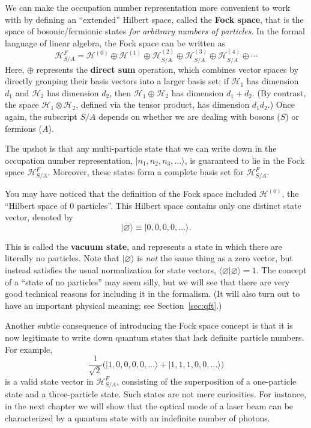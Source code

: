 \documentclass[pra,12pt]{revtex4}
\begin{document}
We can make the occupation number representation more convenient to
work with by defining an ``extended'' Hilbert space, called the
\textbf{Fock space}, that is the space of bosonic/fermionic states
\textit{for arbitrary numbers of particles}.  In the formal language
of linear algebra, the Fock space can be written as
\begin{equation}
  \mathscr{H}_{S/A}^F = \mathscr{H}^{(0)} \oplus \mathscr{H}^{(1)} \oplus \mathscr{H}^{(2)}_{S/A} \oplus \mathscr{H}^{(3)}_{S/A} \oplus \mathscr{H}^{(4)}_{S/A} \oplus \cdots
\end{equation}
Here, $\oplus$ represents the \textbf{direct sum} operation, which
combines vector spaces by directly grouping their basis vectors into a
larger basis set; if $\mathscr{H}_1$ has dimension $d_1$ and
$\mathscr{H}_2$ has dimension $d_2$, then
$\mathscr{H}_1\oplus\mathscr{H}_2$ has dimension $d_1+d_2$.  (By
contrast, the space $\mathscr{H}_1\otimes\mathscr{H}_2$, defined via
the tensor product, has dimension $d_1d_2$.)  Once again, the
subscript $S/A$ depends on whether we are dealing with bosons ($S$) or
fermions ($A$).

The upshot is that any multi-particle state that we can write down in
the occupation number representation, $|n_1,n_2,n_3,\dots\rangle$, is
guaranteed to lie in the Fock space $\mathscr{H}^{F}_{S/A}$.
Moreover, these states form a complete basis set for
$\mathscr{H}^{F}_{S/A}$.

You may have noticed that the definition of the Fock space included
$\mathscr{H}^{(0)}$, the ``Hilbert space of 0 particles''.  This
Hilbert space contains only one distinct state vector, denoted by
\begin{equation}
  |\varnothing\rangle \equiv |0,0,0,0,\dots\rangle.
\end{equation}

This is called the \textbf{vacuum state}, and represents a state in
which there are literally no particles.  Note that
$|\varnothing\rangle$ is \textit{not} the same thing as a zero vector,
but instead satisfies the usual normalization for state vectors,
$\langle\varnothing|\varnothing\rangle = 1$.  The concept of a ``state
of no particles'' may seem silly, but we will see that there are very
good technical reasons for including it in the formalism.  (It will
also turn out to have an important physical meaning; see
Section~\ref{sec:qft}.)

Another subtle consequence of introducing the Fock space concept is
that it is now legitimate to write down quantum states that lack
definite particle numbers.  For example,
\begin{equation*}
  \frac{1}{\sqrt{2}} \Big(|1,0,0,0,0,\dots\rangle + |1,1,1,0,0,\dots\rangle\Big)
\end{equation*}
is a valid state vector in $\mathscr{H}^{F}_{S/A}$, consisting of the
superposition of a one-particle state and a three-particle state.
Such states are not mere curiosities.  For instance, in the next
chapter we will show that the optical mode of a laser beam can be
characterized by a quantum state with an indefinite number of photons.
\end{document}
